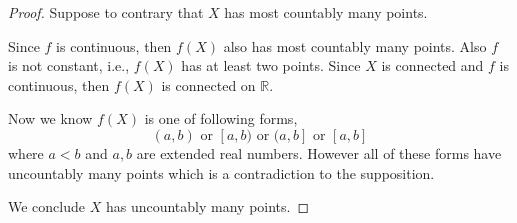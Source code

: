 \begin{Exercise}
\begin{proof}
Suppose to contrary that $X$ has most countably many points. 

Since $f$ is continuous, then $f(X)$ also has most countably many points. Also $f$ is not constant, i.e., $f(X)$ has at least two points. Since $X$ is connected and $f$ is continuous, then $f(X)$ is connected on $\mathbb{R}$. 

Now we know $f(X)$ is one of following forms,
$$
(a,b)\text{ or }[a,b)\text{ or }(a,b]\text{ or } [a,b]
$$
where $a<b$ and $a,b$ are extended real numbers.
However all of these forms have uncountably many points which is a contradiction to the supposition.

We conclude $X$ has uncountably many points.
\end{proof}
\end{Exercise}